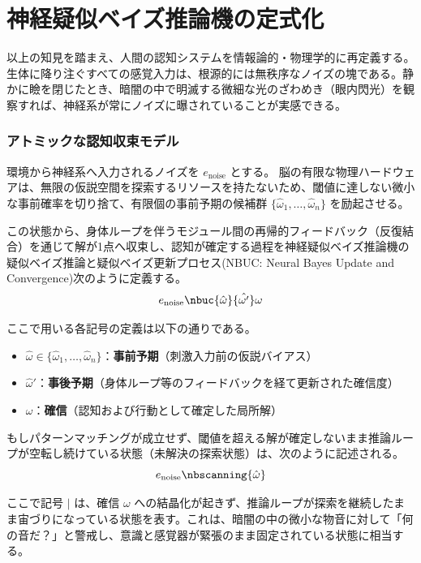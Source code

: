 \chapter{神経疑似ベイズ推論機の定式化}

以上の知見を踏まえ、人間の認知システムを情報論的・物理学的に再定義する。
生体に降り注ぐすべての感覚入力は、根源的には無秩序なノイズの塊である。静かに瞼を閉じたとき、暗闇の中で明滅する微細な光のざわめき（眼内閃光）を観察すれば、神経系が常にノイズに曝されていることが実感できる。

\subsection{アトミックな認知収束モデル}
環境から神経系へ入力されるノイズを $e_{\mathrm{noise}}$ とする。
脳の有限な物理ハードウェアは、無限の仮説空間を探索するリソースを持たないため、閾値に達しない微小な事前確率を切り捨て、有限個の事前予期の候補群 $\{\hat{\omega}_1, \dots, \hat{\omega}_n\}$ を励起させる。

この状態から、身体ループを伴うモジュール間の再帰的フィードバック（反復結合）を通じて解が1点へ収束し、認知が確定する過程を神経疑似ベイズ推論機の疑似ベイズ推論と疑似ベイズ更新プロセス(NBUC: Neural Bayes Update and Convergence)次のように定義する。
\begin{equation}
e_{\mathrm{noise}} \nbuc{\hat{\omega}}{\hat{\omega'}} \omega
\label{eq:neural_bayes}
\end{equation}


ここで用いる各記号の定義は以下の通りである。
\begin{itemize}
  \item $\hat{\omega} \in \{\hat{\omega}_1, \dots, \hat{\omega}_n\}$：\textbf{事前予期}（刺激入力前の仮説バイアス）
  \item $\hat{\omega}'$：\textbf{事後予期}（身体ループ等のフィードバックを経て更新された確信度）
  \item $\omega$：\textbf{確信}（認知および行動として確定した局所解）
\end{itemize}

もしパターンマッチングが成立せず、閾値を超える解が確定しないまま推論ループが空転し続けている状態（未解決の探索状態）は、次のように記述される。
\begin{equation}
    e_{\mathrm{noise}} \nbscanning{\hat{\omega}}
\end{equation}

ここで記号 $\mid$ は、確信 $\omega$ への結晶化が起きず、推論ループが探索を継続したまま宙づりになっている状態を表す。これは、暗闇の中の微小な物音に対して「何の音だ？」と警戒し、意識と感覚器が緊張のまま固定されている状態に相当する。

